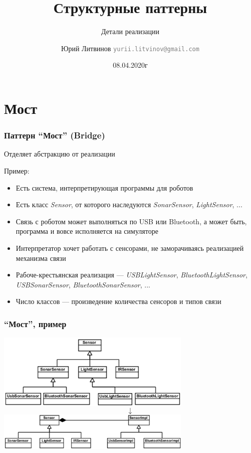 \documentclass[xetex,mathserif,serif]{beamer}
\title{Структурные паттерны}
\subtitle{Детали реализации}
\author[Юрий Литвинов]{Юрий Литвинов \newline \textcolor{gray}{\small\texttt{yurii.litvinov@gmail.com}}}
\date{08.04.2020г}
\begin{document}
    
    \frame{\titlepage}

    \section{Мост}

    \begin{frame}
        \frametitle{Паттерн ``Мост'' (Bridge)}
        Отделяет абстракцию от реализации

        Пример:
        \begin{itemize}
            \item Есть система, интерпретирующая программы для роботов
            \item Есть класс \textit{Sensor}, от которого наследуются \textit{SonarSensor}, \textit{LightSensor}, ...
            \item Связь с роботом может выполняться по USB или Bluetooth, а может быть, программа и вовсе исполняется на симуляторе
            \item Интерпретатор хочет работать с сенсорами, не заморачиваясь реализацией механизма связи
            \item Рабоче-крестьянская реализация --- \textit{USBLightSensor}, \textit{BluetoothLightSensor}, \textit{USBSonarSensor}, \textit{BluetoothSonarSensor}, ...
            \item Число классов --- произведение количества сенсоров и типов связи
        \end{itemize}
    \end{frame}

    \begin{frame}
        \frametitle{``Мост'', пример}
        \begin{center}
            \includegraphics[width=0.7\textwidth]{noBridge.png}
            \Huge{$$\downarrow$$}
            \includegraphics[width=0.7\textwidth]{bridge.png}
        \end{center}
    \end{frame}
\end{document}
